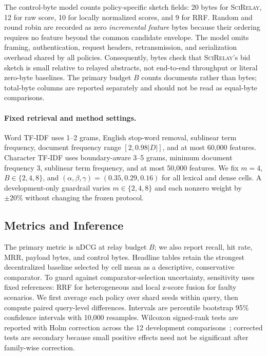 \documentclass[sigconf]{acmart}
\newcommand{\method}{\textsc{SciRelay}}
\newcommand{\ndcg}{nDCG}
\begin{document}
The control-byte model counts policy-specific sketch fields: 20 bytes for \method{}, 12 for raw score, 10 for locally normalized scores, and 9 for RRF. Random and round robin are recorded as zero \emph{incremental feature} bytes because their ordering requires no feature beyond the common candidate envelope. The model omits framing, authentication, request headers, retransmission, and serialization overhead shared by all policies. Consequently, bytes check that \method{}'s bid sketch is small relative to relayed abstracts, not end-to-end throughput or literal zero-byte baselines. The primary budget $B$ counts documents rather than bytes; total-byte columns are reported separately and should not be read as equal-byte comparisons.

\paragraph{Fixed retrieval and method settings.}
Word TF-IDF uses 1--2 grams, English stop-word removal, sublinear term frequency, document frequency range $[2,0.98|D|]$, and at most 60,000 features. Character TF-IDF uses boundary-aware 3--5 grams, minimum document frequency 3, sublinear term frequency, and at most 50,000 features. We fix $m=4$, $B\in\{2,4,8\}$, and $(\alpha,\beta,\gamma)=(0.35,0.29,0.16)$ for all lexical and dense cells. A development-only guardrail varies $m\in\{2,4,8\}$ and each nonzero weight by $\pm20\%$ without changing the frozen protocol.

\subsection{Metrics and Inference}

The primary metric is \ndcg{} at relay budget $B$; we also report recall, hit rate, MRR, payload bytes, and control bytes. Headline tables retain the strongest decentralized baseline selected by cell mean as a descriptive, conservative comparator. To guard against comparator-selection uncertainty, sensitivity uses fixed references: RRF for heterogeneous and local z-score fusion for faulty scenarios. We first average each policy over shard seeds within query, then compute paired query-level differences. Intervals are percentile bootstrap 95\% confidence intervals with 10,000 resamples. Wilcoxon signed-rank tests are reported with Holm correction across the 12 development comparisons~\cite{holm1979procedure}; corrected tests are secondary because small positive effects need not be significant after family-wise correction.
\end{document}
